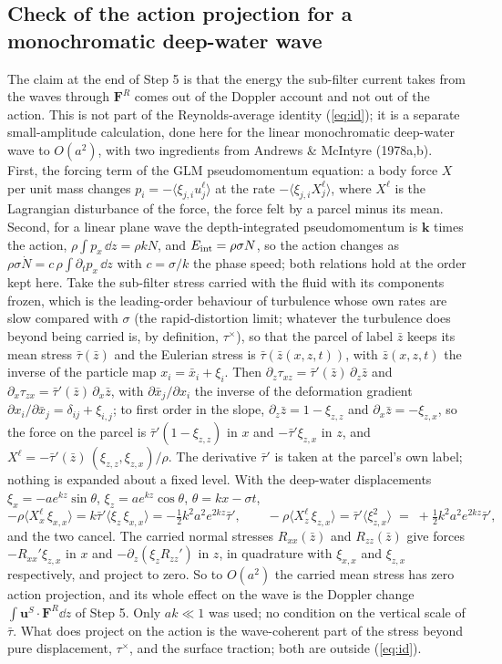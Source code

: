 \documentclass[10pt]{article}
\newcommand{\av}[1]{\langle #1\rangle}\newcommand{\uS}{\bm u^S}\newcommand{\WS}{\mathcal W_S}\newcommand{\PS}{\mathcal P_S}
\begin{document}
\subsection{Check of the action projection for a monochromatic deep-water wave}
The claim at the end of Step 5 is that the energy the sub-filter current takes from the waves through $\bm F^R$ comes out of the Doppler account and not out of the action. This is not part of the Reynolds-average identity (\ref{eq:id}); it is a separate small-amplitude calculation, done here for the linear monochromatic deep-water wave to $O(a^2)$, with two ingredients from Andrews \& McIntyre (1978a,b). First, the forcing term of the GLM pseudomomentum equation: a body force $X$ per unit mass changes $p_i=-\av{\xi_{j,i}u^\ell_j}$ at the rate $-\av{\xi_{j,i}X^\ell_j}$, where $X^\ell$ is the Lagrangian disturbance of the force, the force felt by a parcel minus its mean. Second, for a linear plane wave the depth-integrated pseudomomentum is $\bm k$ times the action, $\rho\!\int\!p_x\,\dd z=\rho kN$, and $E_{\rm int}=\rho\sigma N$, so the action changes as $\rho\sigma\dot N=c\,\rho\!\int\!\partial_tp_x\,\dd z$ with $c=\sigma/k$ the phase speed; both relations hold at the order kept here. Take the sub-filter stress carried with the fluid with its components frozen, which is the leading-order behaviour of turbulence whose own rates are slow compared with $\sigma$ (the rapid-distortion limit; whatever the turbulence does beyond being carried is, by definition, $\tau^\times$), so that the parcel of label $\bar z$ keeps its mean stress $\bar\tau(\bar z)$ and the Eulerian stress is $\bar\tau(\bar z(x,z,t))$, with $\bar z(x,z,t)$ the inverse of the particle map $x_i=\bar x_i+\xi_i$. Then $\partial_z\tau_{xz}=\bar\tau'(\bar z)\,\partial_z\bar z$ and $\partial_x\tau_{zx}=\bar\tau'(\bar z)\,\partial_x\bar z$, with $\partial\bar x_j/\partial x_i$ the inverse of the deformation gradient $\partial x_i/\partial\bar x_j=\delta_{ij}+\xi_{i,j}$; to first order in the slope, $\partial_z\bar z=1-\xi_{z,z}$ and $\partial_x\bar z=-\xi_{z,x}$, so the force on the parcel is $\bar\tau'(1-\xi_{z,z})$ in $x$ and $-\bar\tau'\xi_{z,x}$ in $z$, and $X^\ell=-\bar\tau'(\bar z)\,(\xi_{z,z},\xi_{z,x})/\rho$. The derivative $\bar\tau'$ is taken at the parcel's own label; nothing is expanded about a fixed level. With the deep-water displacements $\xi_x=-ae^{kz}\sin\theta$, $\xi_z=ae^{kz}\cos\theta$, $\theta=kx-\sigma t$,
\[
-\rho\av{X^\ell_x\,\xi_{x,x}}=k\bar\tau'\av{\xi_z\,\xi_{x,x}}=-\tfrac12k^2a^2e^{2kz}\bar\tau',\qquad
-\rho\av{X^\ell_z\,\xi_{z,x}}=\bar\tau'\av{\xi_{z,x}^2}\;=\;+\tfrac12k^2a^2e^{2kz}\bar\tau',
\]
and the two cancel. The carried normal stresses $R_{xx}(\bar z)$ and $R_{zz}(\bar z)$ give forces $-R_{xx}'\xi_{z,x}$ in $x$ and $-\partial_z(\xi_zR_{zz}')$ in $z$, in quadrature with $\xi_{x,x}$ and $\xi_{z,x}$ respectively, and project to zero. So to $O(a^2)$ the carried mean stress has zero action projection, and its whole effect on the wave is the Doppler change $\int\uS\!\cdot\bm F^R\dd z$ of Step 5. Only $ak\ll1$ was used; no condition on the vertical scale of $\bar\tau$. What does project on the action is the wave-coherent part of the stress beyond pure displacement, $\tau^\times$, and the surface traction; both are outside (\ref{eq:id}).
\end{document}
